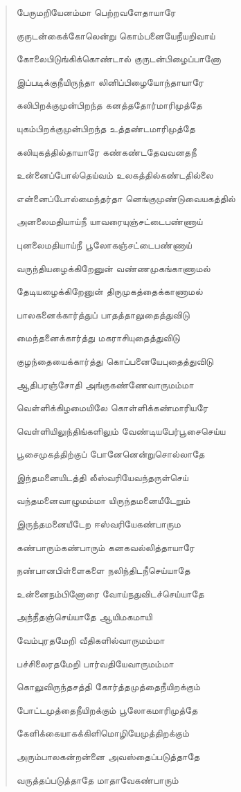 \documentclass{article}
\begin{document}
\begin{quotation}
{பேருமறியேனம்மா பெற்றவளேதாயாரே

குருடன்கைக்கோலென்று கொம்பனையேநீயறிவாய்

கோலைபிடுங்கிக்கொண்டால் குருடன்பிழைப்பானோ

இப்படிக்குநீயிருந்தா லினிப்பிழையோந்தாயாரே

கலிபிறக்குமுன்பிறந்த கனத்ததோர்மாரிமுத்தே

யுகம்பிறக்குமுன்பிறந்த உத்தண்டமாரிமுத்தே

கலியுகத்தில்தாயாரே கண்கண்டதேவவனதநீ

உன்னைப்போல்தெய்வம் உலகத்தில்கண்டதில்லை

என்னைப்போல்மைந்தர்தா னெங்குமுண்டுவையகத்தில்

அனலைமதியாய்நீ யாவரையுஞ்சட்டைபண்ணாய்

புனலைமதியாய்நீ பூலோகஞ்சட்டைபண்ணாய்

வருந்தியழைக்கிறேனுன் வண்ணமுகங்காணாமல்

தேடியழைக்கிறேனுன்‌ திருமுகத்தைக்காணாமல்‌

பாலகனைக்கார்த்துப் பாதத்தாலுதைத்துவிடு

மைந்தனைக்கார்த்து மகராசியுதைத்துவிடு

குழந்தையைக்கார்த்து கொப்பனையேபுதைத்துவிடு

ஆதிபரஞ்சோதி அங்குகண்ணேவாருமம்மா

வெள்ளிக்கிழமையிலே கொள்ளிக்கண்மாரியரே

வெள்ளியிலுந்திங்களிலும் வேண்டியபேர்பூசைசெய்ய

பூசைமுகத்திற்குப் போனேனென்றுசொல்லாதே

இந்தமனையிடத்தி லீஸ்வரியேவந்தருள்செய்

வந்தமனைவாழுமம்மா யிருந்தமனையீடேறும்

இருந்தமனையீடேற ஈஸ்வரியேகண்பாரும

கண்பாரும்கண்பாரும் கனகவல்லித்தாயாரே

நண்பானபிள்ளைகளை நலிந்திடநீசெய்யாதே

உன்னைநம்பினோரை வோய்நதுவிடச்செய்யாதே

அந்நீதஞ்செய்யாதே ஆயிமகமாயி

வேம்புரதமேறி வீதிகளில்வாருமம்மா

பச்சிலைரதமேறி பார்வதியேவாருமம்மா

கொலுவிருந்தசத்தி கோர்த்தமுத்தைநீயிறக்கும்

போட்டமுத்தைநீயிறக்கும் பூலோகமாரிமுத்தே

கேளிக்கையாகக்கிளிமொழியேமுத்திறக்கும்

அரும்பாலகன்றன்னை அவஸ்தைப்படுத்தாதே

வருத்தப்படுத்தாதே மாதாவேகண்பாரும்

}
\end{quotation}
\end{document}
